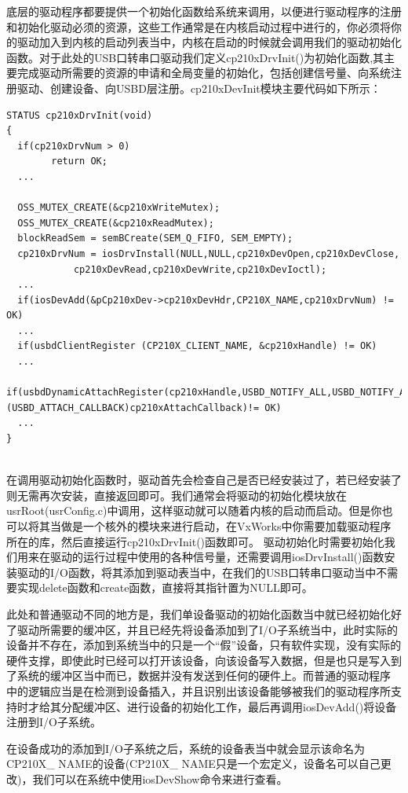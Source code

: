 	底层的驱动程序都要提供一个初始化函数给系统来调用，以便进行驱动程序的注册和初始化驱动必须的资源，这些工作通常是在内核启动过程中进行的，你必须将你的驱动加入到内核的启动列表当中，内核在启动的时候就会调用我们的驱动初始化函数。对于此处的USB口转串口驱动我们定义cp210xDrvInit()为初始化函数,其主要完成驱动所需要的资源的申请和全局变量的初始化，包括创建信号量、向系统注册驱动、创建设备、向USBD层注册。cp210xDevInit模块主要代码如下所示：
\lstset{language=C}
\begin{lstlisting}
STATUS cp210xDrvInit(void)
{ 	
  if(cp210xDrvNum > 0)
		return OK;
  ...
  	
  OSS_MUTEX_CREATE(&cp210xWriteMutex);
  OSS_MUTEX_CREATE(&cp210xReadMutex);
  blockReadSem = semBCreate(SEM_Q_FIFO, SEM_EMPTY);	
  cp210xDrvNum = iosDrvInstall(NULL,NULL,cp210xDevOpen,cp210xDevClose,
			cp210xDevRead,cp210xDevWrite,cp210xDevIoctl);
  ...
  if(iosDevAdd(&pCp210xDev->cp210xDevHdr,CP210X_NAME,cp210xDrvNum) != OK)
  ...  
  if(usbdClientRegister (CP210X_CLIENT_NAME, &cp210xHandle) != OK)
  ...  
  if(usbdDynamicAttachRegister(cp210xHandle,USBD_NOTIFY_ALL,USBD_NOTIFY_ALL,USBD_NOTIFY_ALL,TRUE,(USBD_ATTACH_CALLBACK)cp210xAttachCallback)!= OK)
  ...
}
\end{lstlisting}\\

	在调用驱动初始化函数时，驱动首先会检查自己是否已经安装过了，若已经安装了则无需再次安装，直接返回即可。我们通常会将驱动的初始化模块放在usrRoot(usrConfig.c)中调用，这样驱动就可以随着内核的启动而启动。但是你也可以将其当做是一个核外的模块来进行启动，在VxWorks中你需要加载驱动程序所在的库，然后直接运行cp210xDrvInit()函数即可。
	驱动初始化时需要初始化我们用来在驱动的运行过程中使用的各种信号量，还需要调用iosDrvInstall()函数安装驱动的I/O函数，将其添加到驱动表当中，在我们的USB口转串口驱动当中不需要实现delete函数和create函数，直接将其指针置为NULL即可。
	
	此处和普通驱动不同的地方是，我们单设备驱动的初始化函数当中就已经初始化好了驱动所需要的缓冲区，并且已经先将设备添加到了I/O子系统当中，此时实际的设备并不存在，添加到系统当中的只是一个“假”设备，只有软件实现，没有实际的硬件支撑，即使此时已经可以打开该设备，向该设备写入数据，但是也只是写入到了系统的缓冲区当中而已，数据并没有发送到任何的硬件上。而普通的驱动程序 中的逻辑应当是在检测到设备插入，并且识别出该设备能够被我们的驱动程序所支持时才给其分配缓冲区、进行设备的初始化工作，最后再调用iosDevAdd()将设备注册到I/O子系统。
	
	在设备成功的添加到I/O子系统之后，系统的设备表当中就会显示该命名为CP210X\_ NAME的设备(CP210X\_ NAME只是一个宏定义，设备名可以自己更改)，我们可以在系统中使用iosDevShow命令来进行查看。
	

